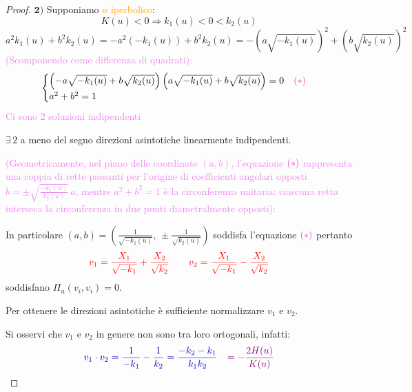 \begin{proof}
        $\mathbf{2)}$ Supponiamo \textcolor{orange}{$u$ iperbolico}:
        \[
        K(u) < 0 \Rightarrow k_1(u) < 0 < k_2(u)
        \]
        \[ a^2 k_1(u) + b^2 k_2(u) = -a^2(-k_1(u)) + b^2 k_2(u) = -\left(a\sqrt{-k_1(u)}\right)^2 + \left(b\sqrt{k_2(u)}\right)^2 \]
        \textcolor{violet}{(Scomponendo come differenza di quadrati):}
        \[
        \begin{cases}
        \left(-a\sqrt{-k_1(u)} + b\sqrt{k_2(u)}\right)\left(a\sqrt{-k_1(u)} + b\sqrt{k_2(u)}\right) = 0 \quad \textcolor{hotpink}{(*)} \\
        a^2 + b^2 = 1
        \end{cases}
        \]
        \textcolor{violet}{Ci sono $2$ soluzioni indipendenti}

        $\exists \, 2$ a meno del segno direzioni asintotiche linearmente indipendenti.

        \textcolor{violet}{(Geometricamente, nel piano delle coordinate $(a,b)$, l'equazione $\textcolor{hotpink}{(*)}$ rappresenta una coppia di rette
         passanti per l'origine di coefficienti angolari opposti $b = \pm \sqrt{\frac{-k_1(u)}{k_2(u)}}\,a$, mentre $a^2+b^2=1$ è la circonferenza
          unitaria; ciascuna retta interseca la circonferenza in due punti diametralmente opposti):}

        \begin{center}
        \end{center}

        In particolare $(a,b) = \left( \frac{1}{\sqrt{-k_1(u)}}, \, \pm \frac{1}{\sqrt{k_2(u)}} \right)$ soddisfa l'equazione $\textcolor{hotpink}{(*)}$ pertanto
        \[
        \textcolor{red}{v_1 = \frac{X_1}{\sqrt{-k_1}} + \frac{X_2}{\sqrt{k_2}} \qquad v_2 = \frac{X_1}{\sqrt{-k_1}} - \frac{X_2}{\sqrt{k_2}}}
        \]
        soddisfano $\Pi_u(v_i, v_i) = 0$.

        Per ottenere le direzioni asintotiche è sufficiente normalizzare $v_1$ e $v_2$.

        \textcolor{blu}{Si osservi che $v_1$ e $v_2$ in genere non sono tra loro ortogonali, infatti:}
        \[ \color{blu} v_1 \cdot v_2 = \frac{1}{-k_1} - \frac{1}{k_2} = \frac{-k_2 - k_1}{k_1 k_2} \quad \textcolor{violet}{= -\frac{2H(u)}{K(u)}}
        \]
        \end{proof}
